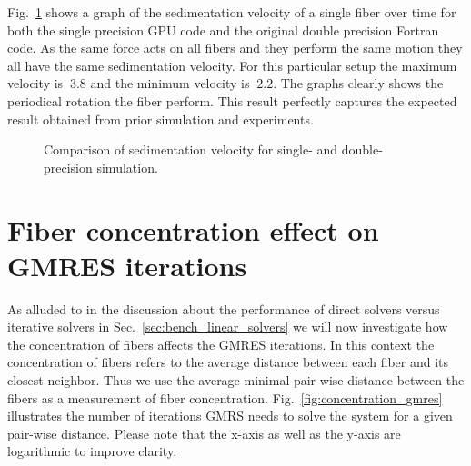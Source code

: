 Fig.~\ref{fig:ring_sedimentation_velocity} shows a graph of the sedimentation velocity of a single fiber over time for both the single precision GPU code and the original double precision Fortran code. As the same force acts on all fibers and they perform the same motion they all have the same sedimentation velocity. For this particular setup the maximum velocity is $~3.8$ and the minimum velocity is $~2.2$. The graphs clearly shows the periodical rotation the fiber perform. This result perfectly captures the expected result obtained from prior simulation and experiments.

\begin{figure}[!htbp]
  \centering
  \caption{Comparison of sedimentation velocity for single- and double-precision simulation.}
  \label{fig:ring_sedimentation_velocity}
\end{figure}

\section{Fiber concentration effect on GMRES iterations}
\label{sec:example_concentration_gmres}

As alluded to in the discussion about the performance of direct solvers versus iterative solvers in Sec.~\ref{sec:bench_linear_solvers} we will now investigate how the concentration of fibers affects the GMRES iterations. In this context the concentration of fibers refers to the average distance between each fiber and its closest neighbor. Thus we use the average minimal pair-wise distance between the fibers as a measurement of fiber concentration. Fig.~\ref{fig:concentration_gmres} illustrates the number of iterations GMRS needs to solve the system for a given pair-wise distance. Please note that the x-axis as well as the y-axis are logarithmic to improve clarity.

